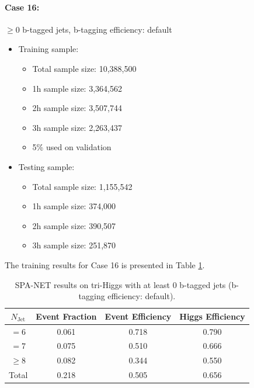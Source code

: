 \documentclass[12pt]{article}
\begin{document}
		\paragraph{Case 16:} $\ge 0$ b-tagged jets, b-tagging efficiency: default
		\begin{itemize}
			\item Training sample:
			\begin{itemize}
				\item Total sample size: 10,388,500
				\item 1h sample size: 3,364,562
				\item 2h sample size: 3,507,744
				\item 3h sample size: 2,263,437
				\item 5\% used on validation
			\end{itemize}
			\item Testing sample: 
				\begin{itemize}
					\item Total sample size: 1,155,542
					\item 1h sample size: 374,000
					\item 2h sample size: 390,507
					\item 3h sample size: 251,870
				\end{itemize}
		\end{itemize}
		The training results for Case 16 is presented in Table \ref{tab:SPANet_triHiggs_0btag_default_20M}.
		\begin{table}[htpb]
			\centering
			\caption{SPA-NET results on tri-Higgs with at least 0 b-tagged jets (b-tagging efficiency: default).}
			\label{tab:SPANet_triHiggs_0btag_default_20M}
			\begin{tabular}{c|c|cc}
				$N_\text{Jet}$ & Event Fraction & Event Efficiency & Higgs Efficiency \\
				\hline
				$=6$	  &   0.061             &    0.718              &    0.790             \\
				$=7$	  &   0.075             &    0.510              &    0.666             \\
				$\ge 8$	  &   0.082             &    0.344              &    0.550             \\
				Total	  &   0.218             &    0.505              &    0.656             \\
			\end{tabular}
		\end{table}
\end{document}
